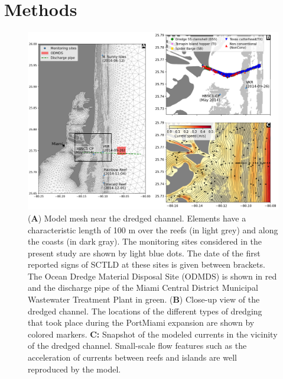 \documentclass[preprint,12pt,authoryear]{elsarticle}
\begin{document}
\section{Methods}

\begin{figure}
	\centering
	\includegraphics[width=\textwidth]{figures/fig_mesh_new.png}
	\caption{(\textbf{A}) Model mesh near the dredged channel. Elements have a characteristic length of 100 m over the reefs (in light grey) and along the coasts (in dark gray). The monitoring sites considered in the present study are shown by light blue dots. The date of the first reported signs of SCTLD at these sites is given between brackets. The Ocean Dredge Material Disposal Site (ODMDS) is shown in red and the discharge pipe of the Miami Central District Municipal Wastewater Treatment Plant in green. (\textbf{B}) Close-up view of the dredged channel. The locations of the different types of dredging that took place during the PortMiami expansion are shown by colored markers. \textbf{C:} Snapshot of the modeled currents in the vicinity of the dredged channel. Small-scale flow features such as the acceleration of currents between reefs and islands are well reproduced by the model.}
	\label{fig:onset_mesh}
\end{figure}
\end{document}
